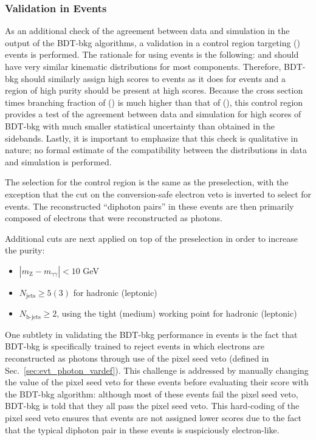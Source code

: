 \subsubsection{Validation in \ttZ Events}
As an additional check of the agreement between data and simulation in the output of the BDT-bkg algorithms, a validation in a control region targeting \ttZ (\Zee) events is performed.
The rationale for using \ttZ events is the following: \ttZ and \ttH should have very similar kinematic distributions for most components.
Therefore, BDT-bkg should similarly assign high scores to \ttZ events as it does for \ttH events and a region of high \ttZ purity should be present at high scores.
Because the cross section times branching fraction of \ttZ (\Zee) is much higher than that of \ttH (\Hgg), this control region provides a test of the agreement between data and simulation for high scores of BDT-bkg with much smaller statistical uncertainty than obtained in the \mgg sidebands.
Lastly, it is important to emphasize that this check is qualitative in nature; no formal estimate of the compatibility between the distributions in data and simulation is performed.

The selection for the \ttZ control region is the same as the preselection, with the exception that the cut on the conversion-safe electron veto is inverted to select for \Zee events.
The reconstructed ``diphoton pairs'' in these events are then primarily composed of electrons that were reconstructed as photons.

Additional cuts are next applied on top of the preselection in order to increase the \ttZ purity:
\begin{itemize}
    \item $|m_{\text{Z}} - m_{\gamma \gamma}| < 10$ GeV
    \item $N_{\text{jets}} \geq 5 (3)$ for hadronic (leptonic)
    \item $N_{\text{b-jets}} \geq 2$, using the tight (medium) working point for hadronic (leptonic)
\end{itemize}

One subtlety in validating the BDT-bkg performance in \ttZ events is the fact that BDT-bkg is specifically trained to reject events in which electrons are reconstructed as photons through use of the pixel seed veto (defined in Sec.~\ref{sec:evt_photon_vardef}).
This challenge is addressed by manually changing the value of the pixel seed veto for these events before evaluating their score with the BDT-bkg algorithm: although most of these events fail the pixel seed veto, BDT-bkg is told that they all pass the pixel seed veto.
This hard-coding of the pixel seed veto ensures that \ttZ events are not assigned lower scores due to the fact that the typical diphoton pair in these events is suspiciously electron-like.

